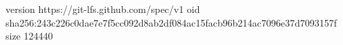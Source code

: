 version https://git-lfs.github.com/spec/v1
oid sha256:243c226c0dae7e7f5cc092d8ab2df084ac15facb96b214ac7096e37d7093157f
size 124440
